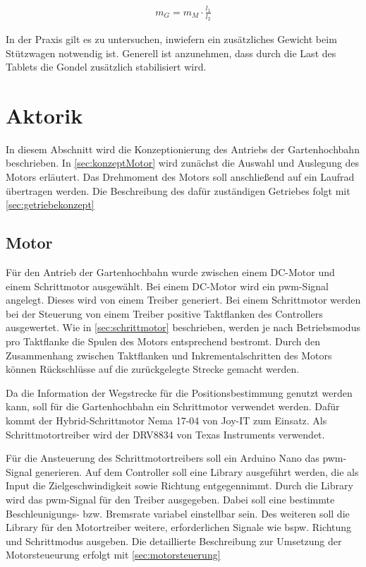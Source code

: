 \begin{align}
	m_G = m_M \cdot \frac{l_1}{l_2}
\end{align}
 
In der Praxis gilt es zu untersuchen, inwiefern ein zusätzliches Gewicht beim Stützwagen notwendig ist. Generell ist anzunehmen, dass durch die Last des Tablets die Gondel zusätzlich stabilisiert wird.  

\section{Aktorik}
\label{sec:konzeptAktorik}
In diesem Abschnitt wird die Konzeptionierung des Antriebs der Gartenhochbahn beschrieben. In \autoref{sec:konzeptMotor} wird zunächst die Auswahl und Auslegung des Motors erläutert. Das Drehmoment des Motors soll anschließend auf ein Laufrad übertragen werden. Die Beschreibung des dafür zuständigen Getriebes folgt mit \autoref{sec:getriebekonzept}

\subsection{Motor}
\label{sec:konzeptMotor}
Für den Antrieb der Gartenhochbahn wurde zwischen einem DC-Motor und einem Schrittmotor ausgewählt. Bei einem DC-Motor wird ein \acrshort{pwm}-Signal angelegt. Dieses wird von einem Treiber generiert. Bei einem Schrittmotor werden bei der Steuerung von einem Treiber positive Taktflanken des Controllers ausgewertet. Wie in \autoref{sec:schrittmotor} beschrieben, werden je nach Betriebsmodus pro Taktflanke die Spulen des Motors entsprechend bestromt. Durch den Zusammenhang zwischen Taktflanken und  Inkrementalschritten des Motors können Rückschlüsse auf die zurückgelegte Strecke gemacht werden.  

Da die Information der Wegstrecke für die Positionsbestimmung genutzt werden kann, soll für die Gartenhochbahn ein Schrittmotor verwendet werden. Dafür kommt der Hybrid-Schrittmotor Nema 17-04 von Joy-IT zum Einsatz. Als Schrittmotortreiber wird der DRV8834 von Texas Instruments verwendet. 


Für die Ansteuerung des Schrittmotortreibers soll ein Arduino Nano das \acrshort{pwm}-Signal generieren. Auf dem Controller soll eine Library ausgeführt werden, die als Input die Zielgeschwindigkeit sowie Richtung entgegennimmt. Durch die Library wird das \acrshort{pwm}-Signal für den Treiber ausgegeben. Dabei soll eine bestimmte Beschleunigungs- bzw. Bremsrate variabel einstellbar sein. Des weiteren soll die Library für den Motortreiber weitere, erforderlichen Signale wie bspw. Richtung und Schrittmodus ausgeben. Die detaillierte Beschreibung zur Umsetzung der Motorsteueurung erfolgt mit \autoref{sec:motorsteuerung} 



